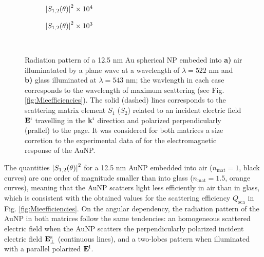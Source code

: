 \begin{figure}[h!]
	\def\svgwidth{.9\textwidth} \small\centering
		\vspace*{3.25em}
		\hspace*{-.25\textwidth}
	\begin{subfigure}{.25\textwidth}%
		\caption{$\abs{S_{1,2}(\theta)}^2\times 10^4$} \label{fig:ScatteringMaps:a}%
		\end{subfigure}%
	\begin{subfigure}{.45\textwidth}%
		\caption{$\abs{S_{1,2}(\theta)}^2\times 10^3$}\label{fig:ScatteringMaps:b}%
		\end{subfigure}%
	\vspace*{-6.25em}\\
	\vspace*{-.5em}
	\caption[Radiation Pattern of a 12.5 nm Au Spherical NP embeded into Air and Glass]{Radiation pattern of a 12.5 nm Au spherical NP embeded into \textbf{a)} air illuminatated by a plane wave at a wavelength of $\lambda = 522$ nm and \textbf{b)} glass illuminated at $\lambda = 543$ nm; the wavlength in each case corresponds to the wavelength of maximum scattering (see Fig. \ref{fig:Mieefficiencies}). The solid (dashed) lines corresponds to the scattering matrix element $S_1$ ($S_2$) related to an incident electric field $\vb{E}^\text{i}$ travelling in the $\vb{k}^\text{i}$ direction  and polarized perpendicularly (prallel) to the page. It was considered for both matrices a size corretion to the experimental data of \citeauthor{johnson_optical_1972} \cite{johnson_optical_1972} for the electromagnetic response of the AuNP.}
	\label{fig:ScatteringMaps}
 \end{figure}

The quantities $\abs{S_{1,2}(\theta)}^2$ for a 12.5 nm AuNP embedded into air ($n_\text{mat} = 1$, black curves) are one order of magnitude smaller  than into glass ($n_\text{mat} = 1.5$, orange curves), meaning that the AuNP scatters light less efficiently in air than in glass, which is consistent with the obtained values for the scattering efficiency $Q_\text{sca}$ in Fig. \ref{fig:Mieefficiencies}. On the angular dependency, the radiation pattern of the AuNP in both matrices follow the same tendencies: an homogeneous scattered electric field when the AuNP scatters the perpendicularly polarized incident electric field  $\vb{E}^\text{s}_\perp$ (continuous lines), and a two-lobes pattern when illuminated with a parallel polarized $\vb{E}^\text{i}$.
